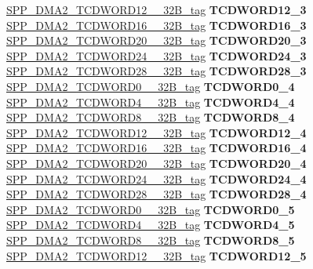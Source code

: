 \begin{DoxyCompactItemize}
\begin{tabbing}
\>\>\mbox{\hyperlink{unionSPP__DMA2__TCDWORD12____32B__tag}{SPP\_DMA2\_TCDWORD12\_\_32B\_tag}} {\bfseries TCDWORD12\_3}\\
\>\>\mbox{\hyperlink{unionSPP__DMA2__TCDWORD16____32B__tag}{SPP\_DMA2\_TCDWORD16\_\_32B\_tag}} {\bfseries TCDWORD16\_3}\\
\>\>\mbox{\hyperlink{unionSPP__DMA2__TCDWORD20____32B__tag}{SPP\_DMA2\_TCDWORD20\_\_32B\_tag}} {\bfseries TCDWORD20\_3}\\
\>\>\mbox{\hyperlink{unionSPP__DMA2__TCDWORD24____32B__tag}{SPP\_DMA2\_TCDWORD24\_\_32B\_tag}} {\bfseries TCDWORD24\_3}\\
\>\>\mbox{\hyperlink{unionSPP__DMA2__TCDWORD28____32B__tag}{SPP\_DMA2\_TCDWORD28\_\_32B\_tag}} {\bfseries TCDWORD28\_3}\\
\>\>\mbox{\hyperlink{unionSPP__DMA2__TCDWORD0____32B__tag}{SPP\_DMA2\_TCDWORD0\_\_32B\_tag}} {\bfseries TCDWORD0\_4}\\
\>\>\mbox{\hyperlink{unionSPP__DMA2__TCDWORD4____32B__tag}{SPP\_DMA2\_TCDWORD4\_\_32B\_tag}} {\bfseries TCDWORD4\_4}\\
\>\>\mbox{\hyperlink{unionSPP__DMA2__TCDWORD8____32B__tag}{SPP\_DMA2\_TCDWORD8\_\_32B\_tag}} {\bfseries TCDWORD8\_4}\\
\>\>\mbox{\hyperlink{unionSPP__DMA2__TCDWORD12____32B__tag}{SPP\_DMA2\_TCDWORD12\_\_32B\_tag}} {\bfseries TCDWORD12\_4}\\
\>\>\mbox{\hyperlink{unionSPP__DMA2__TCDWORD16____32B__tag}{SPP\_DMA2\_TCDWORD16\_\_32B\_tag}} {\bfseries TCDWORD16\_4}\\
\>\>\mbox{\hyperlink{unionSPP__DMA2__TCDWORD20____32B__tag}{SPP\_DMA2\_TCDWORD20\_\_32B\_tag}} {\bfseries TCDWORD20\_4}\\
\>\>\mbox{\hyperlink{unionSPP__DMA2__TCDWORD24____32B__tag}{SPP\_DMA2\_TCDWORD24\_\_32B\_tag}} {\bfseries TCDWORD24\_4}\\
\>\>\mbox{\hyperlink{unionSPP__DMA2__TCDWORD28____32B__tag}{SPP\_DMA2\_TCDWORD28\_\_32B\_tag}} {\bfseries TCDWORD28\_4}\\
\>\>\mbox{\hyperlink{unionSPP__DMA2__TCDWORD0____32B__tag}{SPP\_DMA2\_TCDWORD0\_\_32B\_tag}} {\bfseries TCDWORD0\_5}\\
\>\>\mbox{\hyperlink{unionSPP__DMA2__TCDWORD4____32B__tag}{SPP\_DMA2\_TCDWORD4\_\_32B\_tag}} {\bfseries TCDWORD4\_5}\\
\>\>\mbox{\hyperlink{unionSPP__DMA2__TCDWORD8____32B__tag}{SPP\_DMA2\_TCDWORD8\_\_32B\_tag}} {\bfseries TCDWORD8\_5}\\
\>\>\mbox{\hyperlink{unionSPP__DMA2__TCDWORD12____32B__tag}{SPP\_DMA2\_TCDWORD12\_\_32B\_tag}} {\bfseries TCDWORD12\_5}\\

\end{tabbing}
\end{DoxyCompactItemize}

